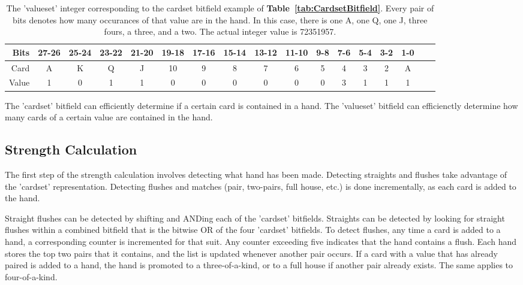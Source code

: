\begin{table}[htb]
\captionsetup{position=top}
\caption[Valueset field]{The 'valueset' integer corresponding to the cardset bitfield example of \textbf{Table~\ref{tab:CardsetBitfield}}.
Every pair of bits denotes how many occurances of that value are in the hand.
In this case, there is one A, one Q, one J, three fours, a three, and a two.
The actual integer value is 72351957.}
\begin{small}
\begin{center}
\begin{tabular}{|r|c|c|c|c|c|c|c|c|c|c|c|c|c|c|c|c|}
\hline
Bits    &  27-26 & 25-24 & 23-22 & 21-20 & 19-18 & 17-16 & 15-14 & 13-12 & 11-10 & 9-8 & 7-6 & 5-4 & 3-2 & 1-0                       \\ \hline
Card    &    A    &     K & Q     & J     & 10    &     9 &     8 & 7     &     6 &  5  &   4 &   3 & 2   & A                          \\ \hline
Value  &    1    &0      & 1     &  1    &  0    & 0     &  0    &  0    &  0    &0    &  3  & 1   & 1   & 1     \\
\hline
\end{tabular}
\label{tab:ValuesetInteger}
\end{center}
\end{small}
\end{table}

The 'cardset' bitfield can efficiently determine if a certain card is contained in a hand.
The 'valueset' bitfield can efficienctly determine how many cards of a certain value are contained in the hand.

\subsection{Strength Calculation}
\label{sec:StrengthCalculation}

The first step of the strength calculation involves detecting what hand has been made.
Detecting straights and flushes take advantage of the 'cardset' representation.
Detecting flushes and matches (pair, two-pairs, full house, etc.) is done incrementally, as each card is added to the hand.

Straight flushes can be detected by shifting and ANDing each of the 'cardset' bitfields.
Straights can be detected by looking for straight flushes within a combined bitfield that is the bitwise OR of the four 'cardset' bitfields.
To detect flushes, any time a card is added to a hand, a corresponding counter is incremented for that suit.
Any counter exceeding five indicates that the hand contains a flush.
Each hand stores the top two pairs that it contains, and the list is updated whenever another pair occurs.
If a card with a value that has already paired is added to a hand, the hand is promoted to a three-of-a-kind, or to a full house if another pair already exists.
The same applies to four-of-a-kind.

